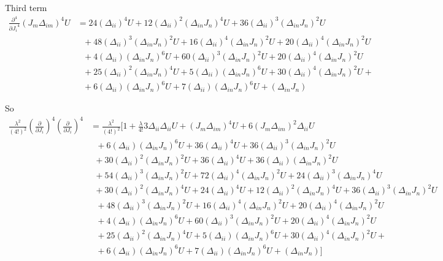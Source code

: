 \documentclass[12pt, letterpaper]{article}
\newcommand*{\1}{\hspace{1pt}}
\begin{document}
    Third term 
    \begin{align*}
        \frac{\partial ^4}{{\partial J_{i}}^4} (J_{m}\Delta_{im})^{4} U &  = 24(\Delta_{ii})^{4}U + 12(\Delta_{ii})^{2}(\Delta_{in}J_{n})^{4}U + 36(\Delta_{ii})^{3}(\Delta_{in}J_{n})^{2}U \\
        & \ \ \ + 48(\Delta_{ii})^{3}(\Delta_{in}J_{n})^{2}U + 16(\Delta_{ii})^{4}(\Delta_{in}J_{n})^{2}U + 20(\Delta_{ii})^{4}(\Delta_{in}J_{n})^{2}U \\ 
        & \ \ \ + 4(\Delta_{ii})(\Delta_{in}J_{n})^{6}U + 60(\Delta_{ii})^{3}(\Delta_{in}J_{n})^{2}U + 20(\Delta_{ii})^{4}(\Delta_{in}J_{n})^{2}U \\ 
        & \ \ \ + 25(\Delta_{ii})^{2}(\Delta_{in}J_{n})^{4}U + 5(\Delta_{ii})(\Delta_{in}J_{n})^{6}U + 30(\Delta_{ii})^{4}(\Delta_{in}J_{n})^{2}U + \\
        & \ \ \ + 6(\Delta_{ii})(\Delta_{in}J_{n})^{6}U + 7(\Delta_{ii})(\Delta_{in}J_{n})^{6}U + (\Delta_{in}J_{n})
    \end{align*}

    So 
    \begin{align*}
        \frac{\lambda ^2}{(4!)^2}(\frac{\partial }{\partial J_{i}})^{4}(\frac{\partial }{\partial J_{i}})^{4}  & = \frac{\lambda ^2}{(4!)^2}[1+\frac{\lambda}{4!}3\Delta_{ii}\Delta_{ii}U + (J_{m}\Delta_{im})^{4} U + 6(J_{m}\Delta_{im})^{2}\Delta_{ii} U \\
        & \ \ \  + 6(\Delta_{ii})(\Delta_{in}J_{n})^{6}U + 36(\Delta_{ii})^{4}U + 36(\Delta_{ii})^{3}(\Delta_{in}J_{n})^{2}U \\
        &  \ \ + 30(\Delta_{ii})^{2}(\Delta_{in}J_{n})^{2}U + 36(\Delta_{ii})^{4}U + 36(\Delta_{ii})(\Delta_{in}J_{n})^{2}U  \\ 
        & \ \ + 54(\Delta_{ii})^{3}(\Delta_{in}J_{n})^{2}U + 72(\Delta_{ii})^{4}(\Delta_{in}J_{n})^{2}U + 24(\Delta_{ii})^{3}(\Delta_{in}J_{n})^{4}U  \\ 
        & \ \ + 30(\Delta_{ii})^{2}(\Delta_{in}J_{n})^{4}U + 24(\Delta_{ii})^{4}U + 12(\Delta_{ii})^{2}(\Delta_{in}J_{n})^{4}U + 36(\Delta_{ii})^{3}(\Delta_{in}J_{n})^{2}U \\
        & \ \ \ + 48(\Delta_{ii})^{3}(\Delta_{in}J_{n})^{2}U + 16(\Delta_{ii})^{4}(\Delta_{in}J_{n})^{2}U + 20(\Delta_{ii})^{4}(\Delta_{in}J_{n})^{2}U \\ 
        & \ \ \ + 4(\Delta_{ii})(\Delta_{in}J_{n})^{6}U + 60(\Delta_{ii})^{3}(\Delta_{in}J_{n})^{2}U + 20(\Delta_{ii})^{4}(\Delta_{in}J_{n})^{2}U \\ 
        & \ \ \ + 25(\Delta_{ii})^{2}(\Delta_{in}J_{n})^{4}U + 5(\Delta_{ii})(\Delta_{in}J_{n})^{6}U + 30(\Delta_{ii})^{4}(\Delta_{in}J_{n})^{2}U + \\
        & \ \ \ + 6(\Delta_{ii})(\Delta_{in}J_{n})^{6}U + 7(\Delta_{ii})(\Delta_{in}J_{n})^{6}U + (\Delta_{in}J_{n})]
    \end{align*}
\end{document}
